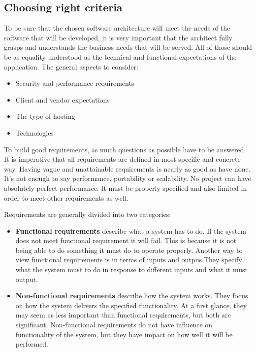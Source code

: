 \subsection{Choosing right criteria}
To be sure that the chosen software architecture will meet the needs of the software that will be developed, it is very important that the architect fully grasps and understands the business needs that will be served. All of those should be as equality understood as the technical and functional expectations of the application. The general aspects to consider:
\begin{itemize}
    \item Security and performance requirements
    \item Client and vendor expectations
    \item The type of hosting
    \item Technologies
\end{itemize}

To build good requirements, as much questions as possible have to be answered. It is imperative that all requirements are defined in most specific and concrete way. Having vague and unattainable requirements is nearly as good as have none. It's not enough to say performance, portability or scalability. No project can have absolutely perfect performance. It must be properly specified and also limited in order to meet other requirements as well\cite{REQUIREMENTS_LIMITED}.

Requirements are generally divided into two categories:
\begin{itemize}
    \item \textbf{Functional requirements} describe what a system has to do. If the system does not meet functional requirement it will fail. This is because it is not being able to do something it must do to operate properly. Another way to view functional requirements is in terms of inputs and outpus.They specify what the system must to do in response to different inputs and what it must output.
    \item \textbf{Non-functional requirements} describe how the system works. They focus on how the system delivers the specified functionality. At a first glance, they may seem as less important than functional requirements, but both are significant. Non-functional requirements do not have influence on functionality of the system, but they have impact on how well it will be performed.
\end{itemize}

